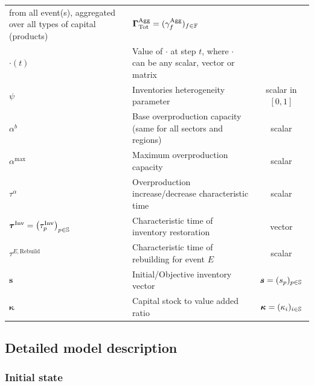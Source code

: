 {\begin{table}[H]
\begin{tabularx}{\linewidth}{
      p{4.5cm}Xc
      }
                                                from all event(s), aggregated
                                                over all types of capital (products) &
                                                                                      $\mathbf{\Gamma}^{\textrm{Agg}}_{\textrm{Tot}}
                                                                                      =
                                                                                      (\gamma^{\textrm{Agg}}_{f})_{f
                                                                                      \in
                                                                                      \mathbb{F}}$\\
      $\cdot(t)$ & Value of $\cdot$ at step $t$, where $\cdot$ can be any scalar, vector or matrix & \\
      $\psi$ & Inventories heterogeneity parameter & scalar in $[0,1]$ \\
      $\alpha^b$ & Base overproduction capacity (same for all sectors and regions) & scalar \\
      $\alpha^{\textrm{max}}$ & Maximum overproduction capacity & scalar \\
      $\tau^{\alpha}$ & Overproduction increase/decrease characteristic time &
                                                                               scalar \\
      $\bm{\tau}^{\textrm{Inv}} = \left( \tau^{\textrm{Inv}}_p \right )_{p \in \mathbb{S}}$ & Characteristic time of inventory restoration & vector \\
      $\tau^{E,\textrm{Rebuild}}$ & Characteristic time of rebuilding for event $E$ & scalar \\
      $\bm{s}$ & Initial/Objective inventory vector & $\bm{s} = (s_{p})_{p \in \mathbb{S}}$ \\
      $\bm{\kappa}$ & Capital stock to value added ratio & $\bm{\kappa} = (\kappa_{i})_{i \in \mathbb{S}}$ \\
      \bottomrule
    \end{tabularx}
  \end{table}
}

\subsection{Detailed model description}
\label{sec:deta-model-descr}

\subsubsection{Initial state}
\label{par:init_sh}

